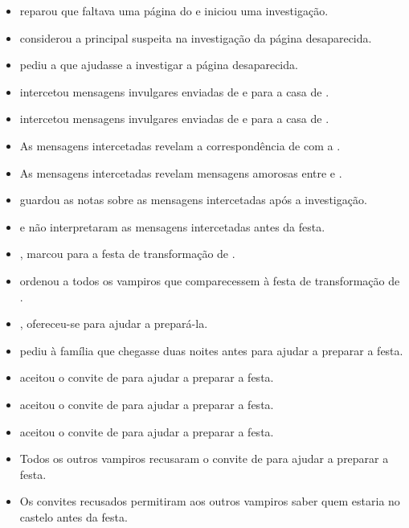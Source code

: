 \begin{itemize}
  \item {} reparou que faltava uma página do  e iniciou uma investigação.
  \item {} considerou  a principal suspeita na investigação da página desaparecida.
  \item {} pediu a  que ajudasse a investigar a página desaparecida.
  \item {} intercetou mensagens invulgares enviadas de e para a casa de .
  \item {} intercetou mensagens invulgares enviadas de e para a casa de .
  \item As mensagens intercetadas revelam a correspondência de  com a .
  \item As mensagens intercetadas revelam mensagens amorosas entre  e .
  \item {} guardou as notas sobre as mensagens intercetadas após a investigação.
  \item {} e  não interpretaram as mensagens intercetadas antes da festa.
  \item {},  marcou  para a festa de transformação de .
  \item {} ordenou a todos os vampiros que comparecessem à festa de transformação de .
  \item {},  ofereceu-se para ajudar  a prepará-la.
  \item {} pediu à família que chegasse duas noites antes para ajudar a preparar a festa.
  \item {} aceitou o convite de  para ajudar a preparar a festa.
  \item {} aceitou o convite de  para ajudar a preparar a festa.
  \item {} aceitou o convite de  para ajudar a preparar a festa.
  \item Todos os outros vampiros recusaram o convite de  para ajudar a preparar a festa.
  \item Os convites recusados permitiram aos outros vampiros saber quem estaria no castelo antes da festa.


\end{itemize}
